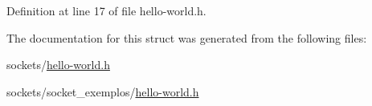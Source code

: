 Definition at line 17 of file hello-\/world.h.



The documentation for this struct was generated from the following files:\begin{DoxyCompactItemize}
\item 
sockets/\hyperlink{hello-world_8h}{hello-\/world.h}\item 
sockets/socket\_\-exemplos/\hyperlink{socket__exemplos_2hello-world_8h}{hello-\/world.h}\end{DoxyCompactItemize}
